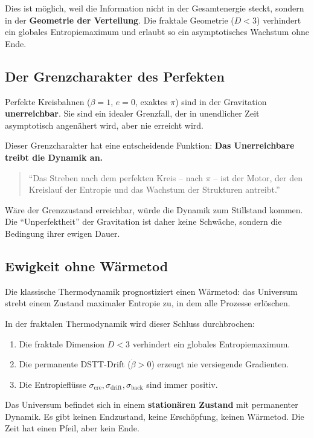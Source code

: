 \documentclass[12pt,a4paper]{article}
\begin{document}
Dies ist möglich, weil die Information nicht in der Gesamtenergie steckt, sondern in der \textbf{Geometrie der Verteilung}. Die fraktale Geometrie ($D<3$) verhindert ein globales Entropiemaximum und erlaubt so ein asymptotisches Wachstum ohne Ende.

\subsection{Der Grenzcharakter des Perfekten}

Perfekte Kreisbahnen ($\beta=1$, $e=0$, exaktes $\pi$) sind in der Gravitation \textbf{unerreichbar}. Sie sind ein idealer Grenzfall, der in unendlicher Zeit asymptotisch angenähert wird, aber nie erreicht wird.

Dieser Grenzcharakter hat eine entscheidende Funktion: \textbf{Das Unerreichbare treibt die Dynamik an.}

\begin{quote}
\enquote{Das Streben nach dem perfekten Kreis – nach $\pi$ – ist der Motor, der den Kreislauf der Entropie und das Wachstum der Strukturen antreibt.}
\end{quote}

Wäre der Grenzzustand erreichbar, würde die Dynamik zum Stillstand kommen. Die \enquote{Unperfektheit} der Gravitation ist daher keine Schwäche, sondern die Bedingung ihrer ewigen Dauer.

\subsection{Ewigkeit ohne Wärmetod}

Die klassische Thermodynamik prognostiziert einen Wärmetod: das Universum strebt einem Zustand maximaler Entropie zu, in dem alle Prozesse erlöschen.

In der fraktalen Thermodynamik wird dieser Schluss durchbrochen:

\begin{enumerate}
    \item Die fraktale Dimension $D<3$ verhindert ein globales Entropiemaximum.
    \item Die permanente DSTT-Drift ($\dot{\beta}>0$) erzeugt nie versiegende Gradienten.
    \item Die Entropieflüsse $\sigma_{\text{cre}}, \sigma_{\text{drift}}, \sigma_{\text{back}}$ sind immer positiv.
\end{enumerate}

Das Universum befindet sich in einem \textbf{stationären Zustand} mit permanenter Dynamik. Es gibt keinen Endzustand, keine Erschöpfung, keinen Wärmetod. Die Zeit hat einen Pfeil, aber kein Ende.
\end{document}
